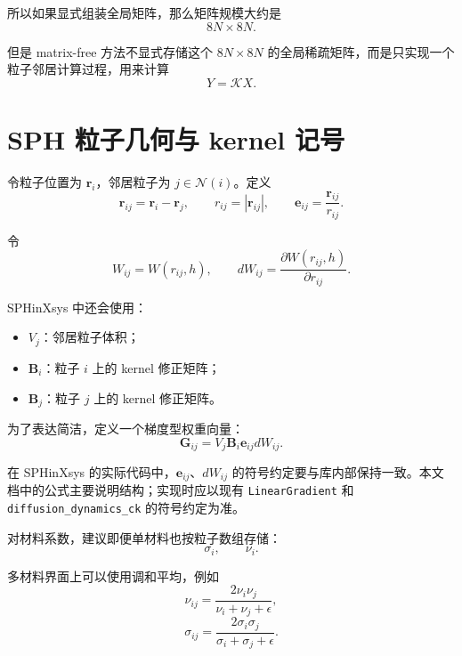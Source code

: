 \documentclass[UTF8,11pt]{ctexart}
\begin{document}
所以如果显式组装全局矩阵，那么矩阵规模大约是
\begin{equation}
    8N \times 8N.
\end{equation}

但是 matrix-free 方法不显式存储这个 $8N\times 8N$ 的全局稀疏矩阵，而是只实现一个粒子邻居计算过程，用来计算
\begin{equation}
    Y = \mathcal{K}X .
\end{equation}

\section{SPH 粒子几何与 kernel 记号}

令粒子位置为 $\bm r_i$，邻居粒子为 $j\in\mathcal{N}(i)$。定义
\begin{equation}
    \bm r_{ij} = \bm r_i - \bm r_j,
    \qquad
    r_{ij} = |\bm r_{ij}|,
    \qquad
    \bm e_{ij} = \frac{\bm r_{ij}}{r_{ij}} .
\end{equation}

令
\begin{equation}
    W_{ij} = W(r_{ij},h),
    \qquad
    dW_{ij} = \frac{\partial W(r_{ij},h)}{\partial r_{ij}} .
\end{equation}

SPHinXsys 中还会使用：
\begin{itemize}
    \item $V_j$：邻居粒子体积；
    \item $\bm B_i$：粒子 $i$ 上的 kernel 修正矩阵；
    \item $\bm B_j$：粒子 $j$ 上的 kernel 修正矩阵。
\end{itemize}

为了表达简洁，定义一个梯度型权重向量：
\begin{equation}
    \bm G_{ij}
    =
    V_j \bm B_i \bm e_{ij} dW_{ij}.
    \label{eq:gij}
\end{equation}

在 SPHinXsys 的实际代码中，$\bm e_{ij}$、$dW_{ij}$ 的符号约定要与库内部保持一致。本文档中的公式主要说明结构；实现时应以现有 \texttt{LinearGradient} 和 \texttt{diffusion\_dynamics\_ck} 的符号约定为准。

对材料系数，建议即便单材料也按粒子数组存储：
\begin{equation}
    \sigma_i,
    \qquad
    \nu_i.
\end{equation}

多材料界面上可以使用调和平均，例如
\begin{equation}
    \nu_{ij}
    =
    \frac{2\nu_i\nu_j}{\nu_i+\nu_j+\epsilon},
\end{equation}
\begin{equation}
    \sigma_{ij}
    =
    \frac{2\sigma_i\sigma_j}{\sigma_i+\sigma_j+\epsilon}.
\end{equation}
\end{document}
